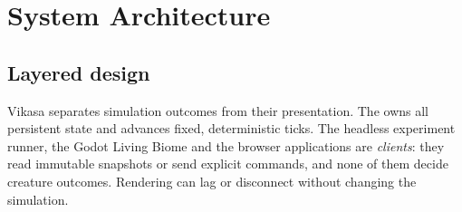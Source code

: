 \chapter{System Architecture}

\section{Layered design}
Vikasa separates simulation outcomes from their presentation. The
 owns all persistent state and advances fixed,
deterministic ticks. The headless experiment runner, the
Godot Living Biome and the browser applications are \emph{clients}: they read
immutable snapshots or send explicit commands, and none of them decide creature
outcomes. Rendering can lag or disconnect without changing the simulation.


